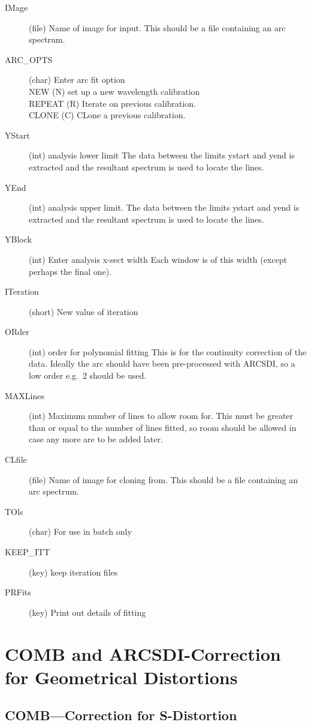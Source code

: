 \begin{description}
\item[IMage] (file) Name of image for input. This should be a file
containing an arc spectrum.
\item[ARC\_OPTS] (char) Enter arc fit option\\
NEW    (N) set up a new wavelength calibration\\
REPEAT (R) Iterate on previous calibration.\\
CLONE  (C) CLone a previous calibration.
\item[YStart] (int) analysis lower limit The data between the
limits ystart and yend is extracted and the resultant spectrum is used
to locate the lines.
\item[YEnd] (int) analysis upper limit. The data between the
limits ystart and yend is extracted and the resultant spectrum is used
to locate the lines.
\item[YBlock] (int) Enter analysis x-sect width Each window is
of this width (except perhaps the final one).
\item[ITeration] (short) New value of iteration
\item[ORder] (int) order for polynomial fitting This is for the
continuity correction of the data. Ideally the arc should have been
pre-processed with ARCSDI, so a low order e.g.\ 2 should be used.
\item[MAXLines] (int) Maximum number of lines to allow room for.
This must be greater than or equal to the number of lines fitted, so
room should be allowed in case any more are to be added later.
\item[CLfile] (file) Name of image for cloning from. This should
be a file containing an arc spectrum.
\item[TOls] (char) For use in batch only
\item[KEEP\_ITT] (key) keep iteration files
\item[PRFits] (key) Print out details of fitting
\end{description}

\section{COMB and ARCSDI-Correction for Geometrical Distortions}

\subsection{COMB---Correction for S-Distortion}


